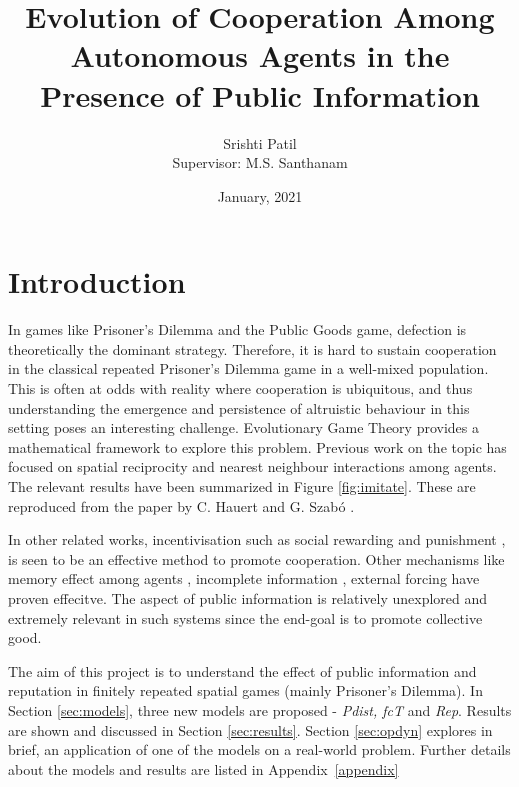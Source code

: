 \documentclass[11pt, A4 paper, twocolumn ]{article}
\title{{\Huge Evolution of Cooperation Among Autonomous Agents in the Presence of Public Information} }
\author{Srishti Patil\\ Supervisor: M.S. Santhanam}
\date{January, 2021}
\begin{document}
	\maketitle
	\thispagestyle{firstpage}
	\section{Introduction}
		\vspace{-0.5cm}
		In games like Prisoner's Dilemma and the Public Goods game, defection is theoretically the dominant strategy. Therefore, it is hard to sustain cooperation \cite{old_repeated, tragedy} in the classical repeated Prisoner's Dilemma game in a well-mixed population. This is often at odds with reality where cooperation is ubiquitous, and thus understanding the emergence and persistence of altruistic behaviour in this setting poses an interesting challenge. Evolutionary Game Theory provides a mathematical framework to explore this problem. Previous work on the topic \cite{gametheoryandphysics, Shirado} has focused on spatial reciprocity \cite{spatial_reciprocity, stratification} and nearest neighbour interactions among agents. The relevant results have been summarized in Figure \ref{fig:imitate}. These are reproduced from the paper by C. Hauert and G. Szab\'{o} \cite{gametheoryandphysics}. \par 
		In other related works, incentivisation such as social rewarding \cite{reward, social_reward, replicator_dynamics, antisocial_rewarding}  and punishment \cite{punishment, synergy, shared_cost, overpunishing}, is seen to be an effective method to promote cooperation. Other mechanisms like memory effect among agents \cite{memory_effect}, incomplete information \cite{incomplete_info}, external forcing \cite{external_forcing} have proven effecitve. The aspect of public information is relatively unexplored and extremely relevant in such systems since the end-goal is to promote collective good. \par 
		The aim of this project is to understand the effect of public information \cite{publicinfo_china} and reputation \cite{inferring_reputation} in finitely repeated spatial games (mainly Prisoner's Dilemma).  In Section \ref{sec:models}, three new models are proposed - \textit{Pdist, fcT } and \textit{Rep}. Results are shown and discussed in Section \ref{sec:results}. Section \ref{sec:opdyn} explores in brief, an application of one of the models on a real-world problem. Further details about the models and results are listed in Appendix~\ref{appendix} \par
	
\end{document}
